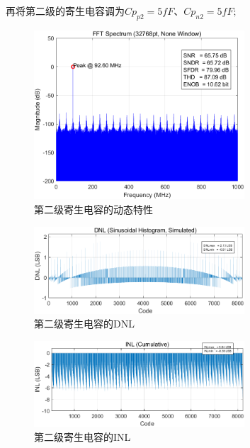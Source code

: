 \documentclass[cs4size,a4paper]{ctexart}
\numberwithin{equation}{section}
\numberwithin{table}{section}
\numberwithin{figure}{section}
\begin{document}
\begin{itemize}
		再将第二级的寄生电容调为$Cp_{p2}  = 5fF $、$ Cp_{n2} = 5fF;$
		\begin{figure}[H]
			\centering
			\includegraphics[width=0.7\textwidth]{pic/Co/DFT2.png}
			\caption{第二级寄生电容的动态特性}
		\end{figure}

		\begin{figure}[H]
			\centering
			\includegraphics[width=0.7\textwidth]{pic/Co/DNL2.png}
			\caption{第二级寄生电容的DNL}
		\end{figure}

		\begin{figure}[H]
			\centering
			\includegraphics[width=0.7\textwidth]{pic/Co/INL2.png}
			\caption{第二级寄生电容的INL}
		\end{figure}


\end{itemize}
\end{document}
